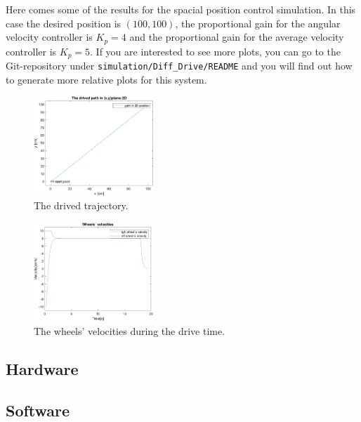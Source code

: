 Here comes some of the results for the spacial position control simulation. In this case the desired position is $(100, 100)$, the proportional gain for the angular velocity controller is $K_p = 4$ and the proportional gain for the average velocity controller is $K_p = 5$. If you are interested to see more plots, you can go to the Git-repository under \texttt{simulation/Diff\_Drive/README} and you will find out how to generate more relative plots for this system.\\

\begin{figure}[ht]
\centering
\includegraphics[width=0.4\textwidth]{sections/assets/traj.png}
\caption{The drived trajectory.}
\end{figure}

\begin{figure}[ht]
\centering
\includegraphics[width=0.4\textwidth]{sections/assets/WV.png}
\caption{The wheels' velocities during the drive time.}
\end{figure}


\subsection{Hardware}

\subsection{Software}

